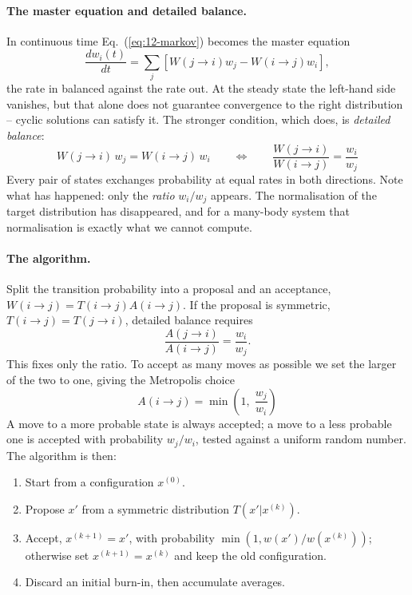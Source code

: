 \paragraph{The master equation and detailed balance.}
In continuous time Eq.~(\ref{eq:12-markov}) becomes the master equation
\begin{equation}
  \frac{dw_i(t)}{dt}
   = \sum_j\left[W(j\to i)w_j - W(i\to j)w_i\right],
  \label{eq:12-master}
\end{equation}
the rate in balanced against the rate out.  At the steady state the left-hand
side vanishes, but that alone does not guarantee convergence to the right
distribution -- cyclic solutions can satisfy it.  The stronger condition,
which does, is \emph{detailed balance}:
\begin{equation}
  \boxed{\;W(j\to i)\,w_j = W(i\to j)\,w_i
  \qquad\Longleftrightarrow\qquad
  \frac{W(j\to i)}{W(i\to j)} = \frac{w_i}{w_j} \;}
  \label{eq:12-detailedbalance}
\end{equation}
Every pair of states exchanges probability at equal rates in both directions.
Note what has happened: only the \emph{ratio} $w_i/w_j$ appears.  The
normalisation of the target distribution has disappeared, and for a many-body
system that normalisation is exactly what we cannot compute.

\paragraph{The algorithm.}
Split the transition probability into a proposal and an acceptance,
$W(i\to j)=T(i\to j)A(i\to j)$.  If the proposal is symmetric,
$T(i\to j)=T(j\to i)$, detailed balance requires
\begin{equation}
  \frac{A(j\to i)}{A(i\to j)} = \frac{w_i}{w_j}.
  \label{eq:12-acceptanceratio}
\end{equation}
This fixes only the ratio.  To accept as many moves as possible we set the
larger of the two to one, giving the Metropolis choice
\begin{equation}
  \boxed{\;
  A(i\to j) = \min\left(1,\;\frac{w_j}{w_i}\right) \;}
  \label{eq:12-metropolis}
\end{equation}
A move to a more probable state is always accepted; a move to a less probable
one is accepted with probability $w_j/w_i$, tested against a uniform random
number.  The algorithm is then:

\begin{svgraybox}
\begin{enumerate}
\item Start from a configuration $x^{(0)}$.
\item Propose $x'$ from a symmetric distribution $T(x'|x^{(k)})$.
\item Accept, $x^{(k+1)}=x'$, with probability $\min(1,w(x')/w(x^{(k)}))$;
  otherwise set $x^{(k+1)}=x^{(k)}$ and keep the old configuration.
\item Discard an initial burn-in, then accumulate averages.
\end{enumerate}
\end{svgraybox}

